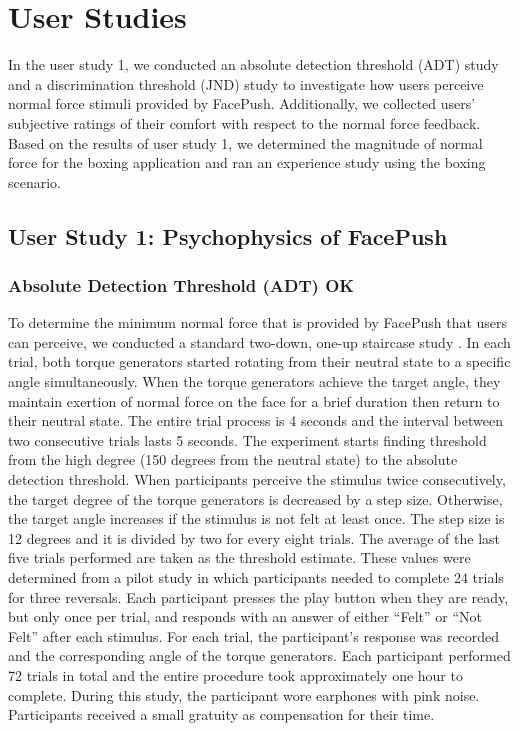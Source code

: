 \chapter{User Studies} \label{chapter:evaluation}
In the user study 1, we conducted an absolute detection threshold (ADT) study and a discrimination threshold (JND) study to investigate how users perceive normal force stimuli provided by FacePush. Additionally, we collected users' subjective ratings of their comfort with respect to the normal force feedback. Based on the results of user study 1, we determined the magnitude of normal force for the boxing application and ran an experience study using the boxing scenario.


\section{User Study 1: Psychophysics of FacePush}

\subsection{Absolute Detection Threshold (ADT) OK}
To determine the minimum normal force that is provided by FacePush that users can perceive, we conducted a standard two-down, one-up staircase study \cite{Lynette2012, Leek2001}. In each trial, both torque generators started rotating from their neutral state to a specific angle simultaneously. When the torque generators achieve the target angle, they maintain exertion of normal force on the face for a brief duration then return to their neutral state. The entire trial process is 4 seconds and the interval between two consecutive trials lasts 5 seconds. The experiment starts finding threshold from the high degree (150 degrees from the neutral state) to the absolute detection threshold. When participants perceive the stimulus twice consecutively, the target degree of the torque generators is decreased by a step size. Otherwise, the target angle increases if the stimulus is not felt at least once. The step size is 12 degrees and it is divided by two for every eight trials. The average of the last five trials performed are taken as the threshold estimate. These values were determined from a pilot study in which participants needed to complete 24 trials for three reversals. Each participant presses the play button when they are ready, but only once per trial, and responds with an answer of either “Felt” or “Not Felt” after each stimulus. For each trial, the participant's response was recorded and the corresponding angle of the torque generators. Each participant performed 72 trials in total and the entire procedure took approximately one hour to complete. During this study, the participant wore earphones with pink noise. Participants received a small gratuity as compensation for their time. 


